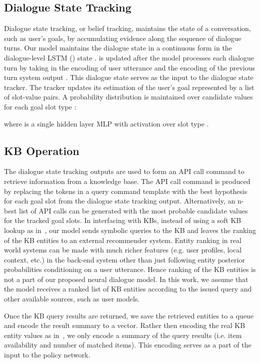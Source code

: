 \documentclass[11pt,a4paper]{article}
\begin{document}
\subsection{Dialogue State Tracking}
    Dialogue state tracking, or belief tracking, maintains the state of a conversation, such as user's goals, by accumulating evidence along the sequence of dialogue turns. Our model maintains the dialogue state in a continuous form in the dialogue-level LSTM () state .  is updated after the model processes each dialogue turn by taking in the encoding of user utterance  and the encoding of the previous turn system output . This dialogue state serves as the input to the dialogue state tracker. The tracker updates its estimation of the user's goal represented by a list of slot-value pairs. A probability distribution  is maintained over candidate values for each goal slot type : 
        
    where  is a single hidden layer MLP with  activation over slot type .

\subsection{KB Operation}
    The dialogue state tracking outputs are used to form an API call command to retrieve information from a knowledge base. The API call command is produced by replacing the tokens in a query command template with the best hypothesis for each goal slot from the dialogue state tracking output. Alternatively, an n-best list of API calls can be generated with the most probable candidate values for the tracked goal slots. 
In interfacing with KBs, instead of using a soft KB lookup as in~\cite{dhingra2017towards}, our model sends symbolic queries to the KB and leaves the ranking of the KB entities to an external recommender system. Entity ranking in real world systems can be made with much richer features (e.g. user profiles, local context, etc.) in the back-end system other than just following entity posterior probabilities conditioning on a user utterance. Hence ranking of the KB entities is not a part of our proposed neural dialogue model. In this work, we assume that the model receives a ranked list of KB entities according to the issued query and other available sources, such as user models.
    
    Once the KB query results are returned, we save the retrieved entities to a queue and encode the result summary to a vector. Rather then encoding the real KB entity values as in~\cite{bordes2017,eric2017copy}, we only encode a summary of the query results (i.e. item availability and number of matched items). This encoding serves as a part of the input to the policy network.
    
\end{document}
